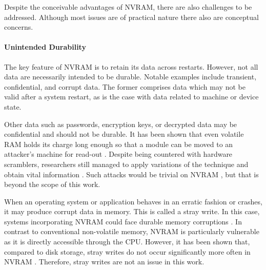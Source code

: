 Despite the conceivable advantages of NVRAM, there are also challenges to be
addressed. Although most issues are of practical nature there also are
conceptual concerns.

\paragraph{Unintended Durability}

The key feature of NVRAM is to retain its data across restarts. However, not all
data are necessarily intended to be durable. Notable examples include transient,
confidential, and corrupt data. The former comprises data which may not be valid
after a system restart, as is the case with data related to machine or device
state.

Other data such as passwords, encryption keys, or decrypted data may be
confidential and should not be durable. It has been shown that even volatile RAM
holds its charge long enough so that a module can be moved to an attacker's
machine for read-out \cite{halderman2008lest}. Despite being countered with
hardware scramblers, researchers still managed to apply variations of the
technique and obtain vital information \cite{yitbarek2017cold}. Such attacks
would be trivial on NVRAM \cite{bailey2011operating}, but that is beyond the
scope of this work.


When an operating system or application behaves in an erratic fashion or
crashes, it may produce corrupt data in memory. This is called a stray write. In
this case, systems incorporating NVRAM could face durable memory corruptions
\cite{condit2009better, venkataraman2011consistent}. In contrast to conventional
non-volatile memory, NVRAM is particularly vulnerable as it is directly
accessible through the CPU. However, it has been shown that, compared to disk
storage, stray writes do not occur significantly more often in NVRAM
\cite{chen1996rio}. Therefore, stray writes are not an issue in this work.


